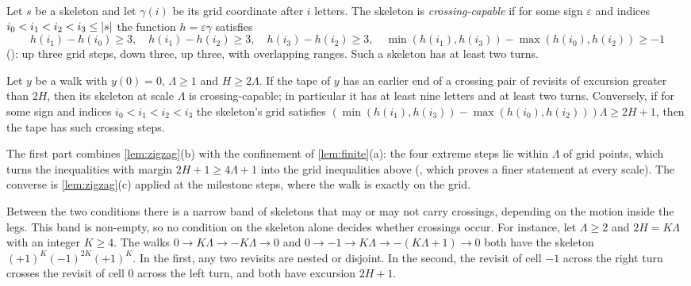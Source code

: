 \begin{definition}\label{def:capable}
Let $s$ be a skeleton and let $\gamma(i)$ be its grid coordinate after $i$ letters. The skeleton is \emph{crossing-capable} if for
some sign $\varepsilon$ and indices $i_0<i_1<i_2<i_3\le\lvert s \rvert$ the function $h=\varepsilon\gamma$ satisfies
\[
  h(i_1)-h(i_0)\ge3,\quad h(i_1)-h(i_2)\ge3,\quad h(i_3)-h(i_2)\ge3,\quad \min(h(i_1),h(i_3))-\max(h(i_0),h(i_2))\ge-1
\]
(): up three grid steps, down three, up three, with overlapping ranges. Such a skeleton has at
least two turns.
\end{definition}

\begin{proposition}\label{prop:capable}
Let $y$ be a walk with $y(0)=0$, $\Lambda\ge1$ and $H\ge2\Lambda$. If the tape of $y$ has an earlier end of a crossing pair of revisits
of excursion greater than $2H$, then its skeleton at scale $\Lambda$ is crossing-capable; in particular it has at least nine
letters and at least two turns. Conversely, if for some sign and indices $i_0<i_1<i_2<i_3$ the skeleton's grid satisfies
$(\min(h(i_1),h(i_3))-\max(h(i_0),h(i_2)))\Lambda\ge2H+1$, then the tape has such crossing steps.
\end{proposition}

\begin{outline}
\begin{sloppypar}
The first part combines \cref{lem:zigzag}(b) with the confinement of \cref{lem:finite}(a): the four extreme steps lie within
$\Lambda$ of grid points, which turns the inequalities with margin $2H+1\ge4\Lambda+1$ into the grid inequalities above
(, which proves a finer statement at every scale). The converse is
\cref{lem:zigzag}(c) applied at the milestone steps, where the walk is exactly on the grid.
\end{sloppypar}
\end{outline}

Between the two conditions there is a narrow band of skeletons that may or may not carry crossings, depending on the motion inside
the legs. This band is non-empty, so no condition on the skeleton alone decides whether crossings occur. For instance, let $\Lambda\ge2$ and
$2H=K\Lambda$ with an integer $K\ge4$. The walks $0\to K\Lambda\to-K\Lambda\to0$ and $0\to-1\to K\Lambda\to-(K\Lambda+1)\to0$ both have the skeleton
$(+1)^K(-1)^{2K}(+1)^K$. In the first, any two revisits are nested or disjoint. In the second, the revisit of cell $-1$ across the right
turn crosses the revisit of cell $0$ across the left turn, and both have excursion $2H+1$.

